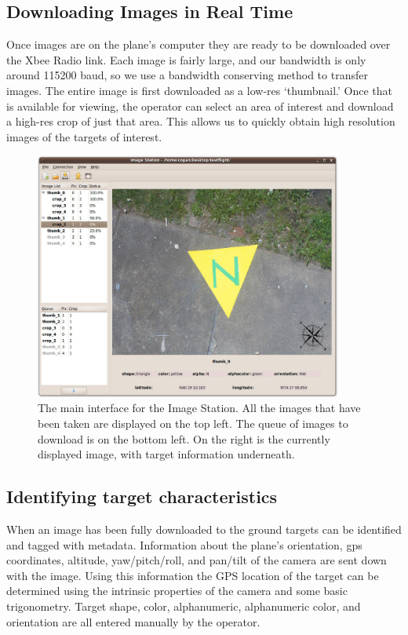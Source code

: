 \documentclass[10pt]{report}
\begin{document}
\subsection{Downloading Images in Real Time}

Once images are on the plane's computer they are ready to be downloaded over the Xbee Radio link.  Each image is fairly large, and our bandwidth is only around 115200 baud, so we use a bandwidth conserving method to transfer images.  The entire image is first downloaded as a low-res `thumbnail.'  Once that is available for viewing, the operator can select an area of interest and download a high-res crop of just that area.  This allows us to quickly obtain high resolution images of the targets of interest.

\begin{figure} [h]
  \centering
  	\includegraphics[width=0.9\textwidth]{../images/ImageStationMain.jpg}
  	\caption[Image Station Interface]{The main interface for the Image Station.  All the images that have been taken are displayed on the top left.  The queue of images to download is on the bottom left.  On the right is the currently displayed image, with target information underneath.}
  	\label{fig:imagestationinterface}
\end{figure}

\subsection{Identifying target characteristics}

When an image has been fully downloaded to the ground targets can be identified and tagged with metadata.  Information about the plane's orientation, gps coordinates, altitude, yaw/pitch/roll, and pan/tilt of the camera are sent down with the image.  Using this information the GPS location of the target can be determined using the intrinsic properties of the camera and some basic trigonometry. Target shape, color, alphanumeric, alphanumeric color, and orientation are all entered manually by the operator.
\end{document}
